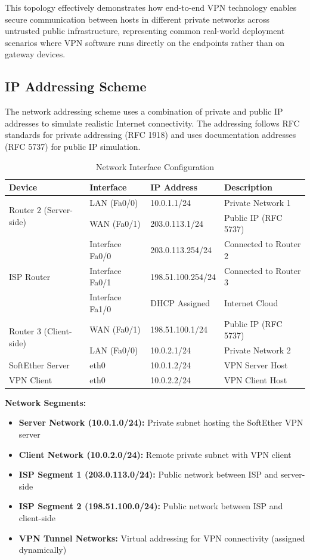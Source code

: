 This topology effectively demonstrates how end-to-end VPN technology enables secure communication between hosts in different private networks across untrusted public infrastructure, representing common real-world deployment scenarios where VPN software runs directly on the endpoints rather than on gateway devices.

\subsection{IP Addressing Scheme}

The network addressing scheme uses a combination of private and public IP addresses to simulate realistic Internet connectivity. The addressing follows RFC standards for private addressing (RFC 1918) and uses documentation addresses (RFC 5737) for public IP simulation.

\begin{table}[H]
\centering
\caption{Network Interface Configuration}
\label{tab:ip_addressing}
\begin{tabular}{|l|l|l|l|}
\hline
\textbf{Device} & \textbf{Interface} & \textbf{IP Address} & \textbf{Description} \\
\hline
\multirow{2}{*}{Router 2 (Server-side)} & LAN (Fa0/0) & 10.0.1.1/24 & Private Network 1 \\
 & WAN (Fa0/1) & 203.0.113.1/24 & Public IP (RFC 5737) \\
\hline
\multirow{3}{*}{ISP Router} & Interface Fa0/0 & 203.0.113.254/24 & Connected to Router 2 \\
 & Interface Fa0/1 & 198.51.100.254/24 & Connected to Router 3 \\
 & Interface Fa1/0 & DHCP Assigned & Internet Cloud \\
\hline
\multirow{2}{*}{Router 3 (Client-side)} & WAN (Fa0/1) & 198.51.100.1/24 & Public IP (RFC 5737) \\
 & LAN (Fa0/0) & 10.0.2.1/24 & Private Network 2 \\
\hline
SoftEther Server & eth0 & 10.0.1.2/24 & VPN Server Host \\
\hline
VPN Client & eth0 & 10.0.2.2/24 & VPN Client Host \\
\hline
\end{tabular}
\end{table}

\textbf{Network Segments:}

\begin{itemize}
    \item \textbf{Server Network (10.0.1.0/24):} Private subnet hosting the SoftEther VPN server
    \item \textbf{Client Network (10.0.2.0/24):} Remote private subnet with VPN client
    \item \textbf{ISP Segment 1 (203.0.113.0/24):} Public network between ISP and server-side 
    \item \textbf{ISP Segment 2 (198.51.100.0/24):} Public network between ISP and client-side 
    \item \textbf{VPN Tunnel Networks:} Virtual addressing for VPN connectivity (assigned dynamically)
\end{itemize}

